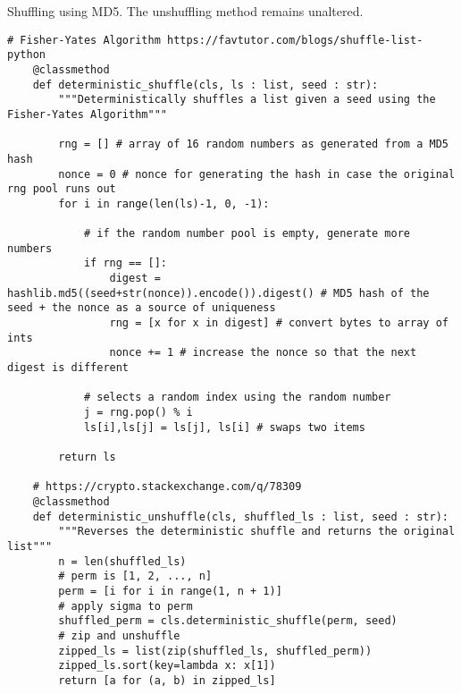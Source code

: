 \documentclass[11pt]{article}
\begin{document}
\begin{Large}
Shuffling using MD5. The unshuffling method remains unaltered.
\end{Large}
\begin{lstlisting}[captionpos=b label=listing:sparql_getallindividuals,
   basicstyle=\ttfamily]
 # Fisher-Yates Algorithm https://favtutor.com/blogs/shuffle-list-python
    @classmethod
    def deterministic_shuffle(cls, ls : list, seed : str):
        """Deterministically shuffles a list given a seed using the Fisher-Yates Algorithm""" 

        rng = [] # array of 16 random numbers as generated from a MD5 hash
        nonce = 0 # nonce for generating the hash in case the original rng pool runs out
        for i in range(len(ls)-1, 0, -1):

            # if the random number pool is empty, generate more numbers 
            if rng == []:
                digest = hashlib.md5((seed+str(nonce)).encode()).digest() # MD5 hash of the seed + the nonce as a source of uniqueness
                rng = [x for x in digest] # convert bytes to array of ints
                nonce += 1 # increase the nonce so that the next digest is different

            # selects a random index using the random number
            j = rng.pop() % i
            ls[i],ls[j] = ls[j], ls[i] # swaps two items
        
        return ls

    # https://crypto.stackexchange.com/q/78309
    @classmethod
    def deterministic_unshuffle(cls, shuffled_ls : list, seed : str):
        """Reverses the deterministic shuffle and returns the original list"""
        n = len(shuffled_ls)
        # perm is [1, 2, ..., n]
        perm = [i for i in range(1, n + 1)]
        # apply sigma to perm
        shuffled_perm = cls.deterministic_shuffle(perm, seed)
        # zip and unshuffle
        zipped_ls = list(zip(shuffled_ls, shuffled_perm))
        zipped_ls.sort(key=lambda x: x[1])
        return [a for (a, b) in zipped_ls]
\end{lstlisting}
\end{document}
